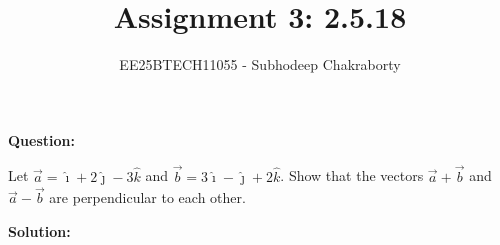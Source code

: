 \documentclass[journal,12pt,onecolumn]{IEEEtran}
\theoremstyle{remark}
\begin{document}

\vspace{3cm}

\title{Assignment 3: 2.5.18}
\author{EE25BTECH11055 - Subhodeep Chakraborty}
\maketitle
\hrulefill
\bigskip

\renewcommand{\thefigure}{\theenumi}
\renewcommand{\thetable}{\theenumi}

\textbf{Question:}\par
Let $\vec{a} = \hat{\imath} + 2\hat{\jmath} -3\hat{k}$ and $\vec{b} = 3\hat{\imath} - \hat{\jmath} + 2\hat{k}$. Show that the vectors $\vec{a}+\vec{b}$ and $\vec{a}-\vec{b}$ are perpendicular to each other. \par
\textbf{Solution:}\par
\end{document}
